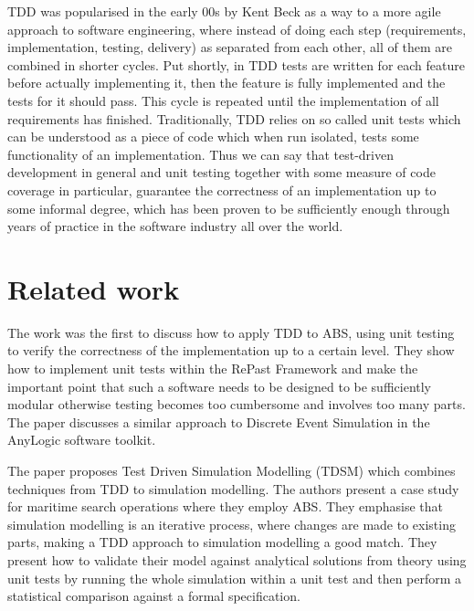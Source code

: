 TDD was popularised in the early 00s by Kent Beck \cite{beck_test_2002} as a way to a more agile approach to software engineering, where instead of doing each step (requirements, implementation, testing, delivery) as separated from each other, all of them are combined in shorter cycles. Put shortly, in TDD tests are written for each feature before actually implementing it, then the feature is fully implemented and the tests for it should pass. This cycle is repeated until the implementation of all requirements has finished. Traditionally, TDD relies on so called unit tests which can be understood as a piece of code which when run isolated, tests some functionality of an implementation. Thus we can say that test-driven development in general and unit testing together with some measure of code coverage in particular, guarantee the correctness of an implementation up to some informal degree, which has been proven to be sufficiently enough through years of practice in the software industry all over the world. 

\medskip

\section*{Related work}
The work \cite{collier_test-driven_2013} was the first to discuss how to apply TDD to ABS, using unit testing to verify the correctness of the implementation up to a certain level. They show how to implement unit tests within the RePast Framework \cite{north_complex_2013} and make the important point that such a software needs to be designed to be sufficiently modular otherwise testing becomes too cumbersome and involves too many parts. The paper \cite{asta_investigation_2014} discusses a similar approach to Discrete Event Simulation in the AnyLogic software toolkit. 

The paper \cite{onggo_test-driven_2016} proposes Test Driven Simulation Modelling (TDSM) which combines techniques from TDD to simulation modelling. The authors present a case study for maritime search operations where they employ ABS. They emphasise that simulation modelling is an iterative process, where changes are made to existing parts, making a TDD approach to simulation modelling a good match. They present how to validate their model against analytical solutions from theory using unit tests by running the whole simulation within a unit test and then perform a statistical comparison against a formal specification. %

